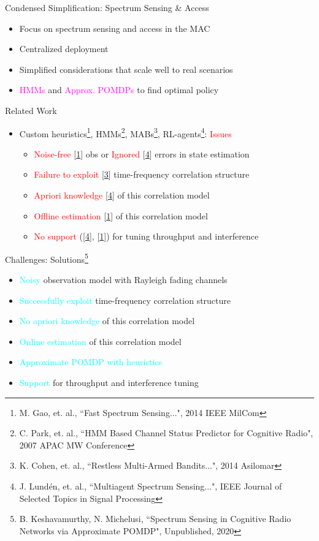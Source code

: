 \documentclass{beamer}
\begin{document}
\begin{frame}{Condensed Simplification: Spectrum Sensing \& Access}
\begin{itemize}
    \item Focus on spectrum sensing and access in the MAC
    \item Centralized deployment
    \item Simplified considerations that scale well to real scenarios
    \item \textcolor{magenta}{HMMs} and \textcolor{magenta}{Approx. POMDPs} to find optimal policy
\end{itemize}
\end{frame}
\begin{frame}{Related Work}
\begin{itemize}
  \item Custom heuristics\footnote{\label{F4}\tiny{M. Gao, et. al., ``Fast Spectrum Sensing...", 2014 IEEE MilCom}}, HMMs\footnote{\label{F6}\tiny{C. Park, et. al., ``HMM Based Channel Status Predictor for Cognitive Radio", 2007 APAC MW Conference}}, MABs\footnote{\label{F5}\tiny{K. Cohen, et. al., ``Restless Multi-Armed Bandits...", 2014 Asilomar}}, RL-agents\footnote{\label{F3}\tiny{J. Lund\'{e}n, et. al., ``Multiagent Spectrum Sensing...", IEEE Journal of Selected Topics in Signal Processing}}: \textcolor{red}{Issues}
  \begin{itemize}
      \item \textcolor{red}{Noise-free} [\ref{F4}] obs or \textcolor{red}{Ignored} [\ref{F3}] errors in state estimation
      \item \textcolor{red}{Failure to exploit} [\ref{F5}] time-frequency correlation structure
      \item \textcolor{red}{Apriori knowledge} [\ref{F3}] of this correlation model
      \item \textcolor{red}{Offline estimation} [\ref{F4}] of this correlation model
      \item \textcolor{red}{No support} ([\ref{F3}], [\ref{F4}]) for tuning throughput and interference
  \end{itemize}
\end{itemize}
\end{frame}
\begin{frame}{Challenges: Solutions\footnote{\tiny{B. Keshavamurthy, N. Michelusi, ``Spectrum Sensing in Cognitive Radio Networks via Approximate POMDP", Unpublished, 2020}}}
\begin{itemize}
    \item \textcolor{cyan}{Noisy} observation model with Rayleigh fading channels
    \item \textcolor{cyan}{Successfully exploit} time-frequency correlation structure
    \item \textcolor{cyan}{No apriori knowledge} of this correlation model
    \item \textcolor{cyan}{Online estimation} of this correlation model
    \item \textcolor{cyan}{Approximate POMDP with heuristics}
    \item \textcolor{cyan}{Support} for throughput and interference tuning
\end{itemize}
\end{frame}
\end{document}
